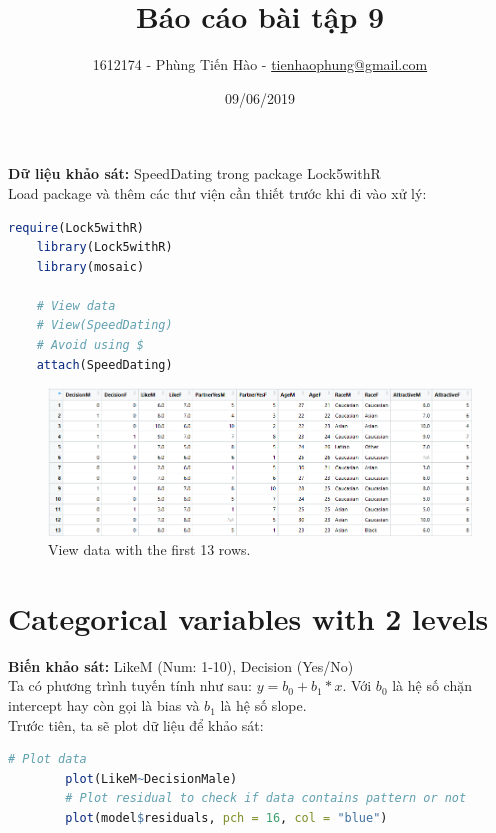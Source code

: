 \documentclass[a4paper,12pt]{article}
\title{Báo cáo bài tập 9}
\author{1612174 - Phùng Tiến Hào - \href{mailto:tienhaophung@gmail.com}{tienhaophung@gmail.com}}
\date{09/06/2019}
\begin{document}
	\maketitle
	\newpage
	
	\doublespacing
	\tableofcontents
	\singlespace
	
	\newpage
	
	\textbf{Dữ liệu khảo sát:} SpeedDating trong package Lock5withR\\
	
	Load package và thêm các thư viện cần thiết trước khi đi vào xử lý:
	\begin{lstlisting}[language=R]
	require(Lock5withR)
	library(Lock5withR)
	library(mosaic)
	
	# View data
	# View(SpeedDating)
	# Avoid using $
	attach(SpeedDating)
	\end{lstlisting}
	
	\begin{figure}[H]
		\centering
		\includegraphics[width=0.7\linewidth]{view_data}
		\caption{View data with the first 13 rows.}
		\label{fig:viewdata}
	\end{figure}
	
	\section{Categorical variables with 2 levels}
	
	\textbf{Biến khảo sát: }LikeM (Num: 1-10), Decision (Yes/No)\\
	Ta có phương trình tuyến tính như sau: $y = b_0 + b_1*x$. Với $b_0$ là hệ số chặn intercept hay còn gọi là bias và $b_1$ là hệ số slope.\\
	
	Trước tiên, ta sẽ plot dữ liệu để khảo sát:
	\begin{lstlisting}[language=R]
		# Plot data
		plot(LikeM~DecisionMale)
		# Plot residual to check if data contains pattern or not  
		plot(model$residuals, pch = 16, col = "blue")
	\end{lstlisting}
	
\end{document}
